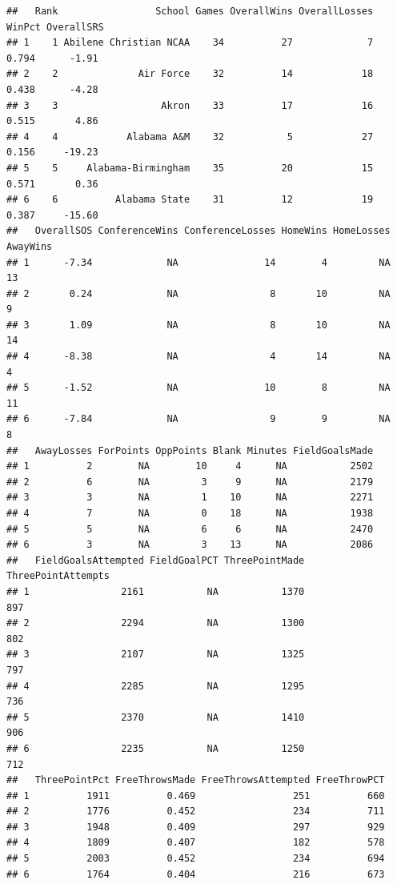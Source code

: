 \documentclass[
]{book}
\begin{document}
\begin{verbatim}
##   Rank                 School Games OverallWins OverallLosses WinPct OverallSRS
## 1    1 Abilene Christian NCAA    34          27             7  0.794      -1.91
## 2    2              Air Force    32          14            18  0.438      -4.28
## 3    3                  Akron    33          17            16  0.515       4.86
## 4    4            Alabama A&M    32           5            27  0.156     -19.23
## 5    5     Alabama-Birmingham    35          20            15  0.571       0.36
## 6    6          Alabama State    31          12            19  0.387     -15.60
##   OverallSOS ConferenceWins ConferenceLosses HomeWins HomeLosses AwayWins
## 1      -7.34             NA               14        4         NA       13
## 2       0.24             NA                8       10         NA        9
## 3       1.09             NA                8       10         NA       14
## 4      -8.38             NA                4       14         NA        4
## 5      -1.52             NA               10        8         NA       11
## 6      -7.84             NA                9        9         NA        8
##   AwayLosses ForPoints OppPoints Blank Minutes FieldGoalsMade
## 1          2        NA        10     4      NA           2502
## 2          6        NA         3     9      NA           2179
## 3          3        NA         1    10      NA           2271
## 4          7        NA         0    18      NA           1938
## 5          5        NA         6     6      NA           2470
## 6          3        NA         3    13      NA           2086
##   FieldGoalsAttempted FieldGoalPCT ThreePointMade ThreePointAttempts
## 1                2161           NA           1370                897
## 2                2294           NA           1300                802
## 3                2107           NA           1325                797
## 4                2285           NA           1295                736
## 5                2370           NA           1410                906
## 6                2235           NA           1250                712
##   ThreePointPct FreeThrowsMade FreeThrowsAttempted FreeThrowPCT
## 1          1911          0.469                 251          660
## 2          1776          0.452                 234          711
## 3          1948          0.409                 297          929
## 4          1809          0.407                 182          578
## 5          2003          0.452                 234          694
## 6          1764          0.404                 216          673

\end{verbatim}
\end{document}
